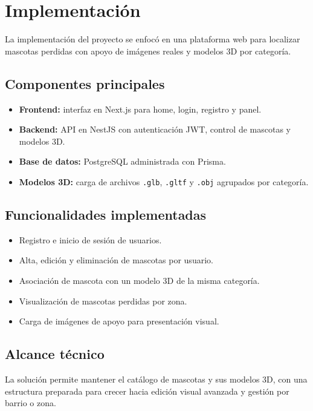\section{Implementaci\'on}

La implementaci\'on del proyecto se enfoc\'o en una plataforma web para localizar mascotas perdidas con apoyo de im\'agenes reales y modelos 3D por categor\'ia.

\subsection{Componentes principales}
\begin{itemize}[leftmargin=*]
    \item \textbf{Frontend:} interfaz en Next.js para home, login, registro y panel.
    \item \textbf{Backend:} API en NestJS con autenticaci\'on JWT, control de mascotas y modelos 3D.
    \item \textbf{Base de datos:} PostgreSQL administrada con Prisma.
    \item \textbf{Modelos 3D:} carga de archivos \texttt{.glb}, \texttt{.gltf} y \texttt{.obj} agrupados por categor\'ia.
\end{itemize}

\subsection{Funcionalidades implementadas}
\begin{itemize}[leftmargin=*]
    \item Registro e inicio de sesi\'on de usuarios.
    \item Alta, edici\'on y eliminaci\'on de mascotas por usuario.
    \item Asociaci\'on de mascota con un modelo 3D de la misma categor\'ia.
    \item Visualizaci\'on de mascotas perdidas por zona.
    \item Carga de im\'agenes de apoyo para presentaci\'on visual.
\end{itemize}

\subsection{Alcance t\'ecnico}
La soluci\'on permite mantener el cat\'alogo de mascotas y sus modelos 3D, con una estructura preparada para crecer hacia edici\'on visual avanzada y gesti\'on por barrio o zona.
